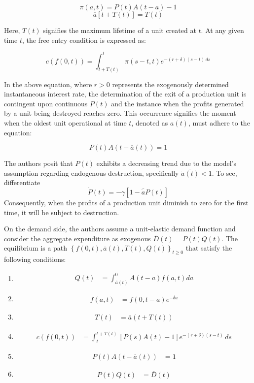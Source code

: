 \documentclass[12pt]{report}
\begin{document}
\[\pi(a,t)= P(t)A(t-a)-1\]
\[\overline{a}[t+T(t)] = T(t)\]

Here, \(T(t)\) signifies the maximum lifetime of a unit created at \(t\). At any given time \(t\), the free entry
condition is expressed as: 

\[ c(f(0,t)) = \int_{t+T(t)}^{t}\pi(s-t,t)e^{-(r+\delta)(s-t)\,ds} \]

In the above equation, where \(r>0\) represents the exogenously determined instantaneous interest rate, the determination of
the exit of a production unit is contingent upon continuous \(P(t)\) and the instance when the profits generated by a
unit being destroyed reaches zero. This occurrence signifies the moment when the oldest unit operational at time \(t\),
denoted as \(\overline{a(t)}\), must adhere to the equation: 

\[P(t)A(t-\overline{a}(t))=1\]

The authors posit that \(P(t)\) exhibits a decreasing trend due to the model's assumption regarding endogenous
destruction, specifically \(\overline{\dot{a}(t)}<1\). To see, differentiate 
\[\dot{P}(t)=-\gamma\left[1-\overline{\dot{a}}P(t)\right]\]
Consequently, when the profits of a production unit diminish to
zero for the first time, it will be subject to destruction. 

On the demand side, the authors assume a unit-elastic demand function and consider the aggregate expenditure as
exogenous 
\(\overline{D}(t)=P(t)Q(t)\). 
The equilibrium is a path \(\left\{f(0,t),\overline{a}(t),T(t),Q(t)\right\}_{t \geq 0}\) that satisfy the following
conditions:
\begin{enumerate}
    \item \label{eq_2.1} 
        \begin{align*}
            Q(t) &= \int_{\overline{a}(t)}^{0}A(t-a)f(a,t)da
        \end{align*}
    \item \label{eq_2.2}
        \begin{align*}
            f(a,t)&=f(0,t-a)e^{-\delta a}      
        \end{align*}
    \item \label{eq_2.3}
        \begin{align*}
            T(t)&=\overline{a}\left(t+T(t)\right)        
        \end{align*}
    \item \label{eq_2.4}
        \begin{align*}
            c(f(0,t))&=\int_{t}^{t+T(t)}\left[P(s)A(t)-1\right]e^{-(r+\delta)(s-t)}\,ds
        \end{align*}
    \item \label{eq_2.5}
        \begin{align*}
            P(t)A(t-\overline{a}(t))&=1
        \end{align*}
    \item \label{eq_2.6}
        \begin{align*}
            P(t)Q(t)&=\overline{D}(t)
        \end{align*}
\end{enumerate}
\end{document}
